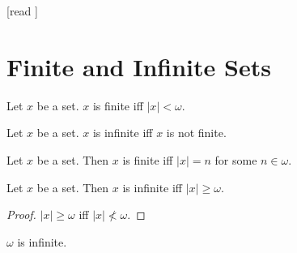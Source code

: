 \documentclass[10pt]{article}
\begin{document}
  \begin{imports}
    \begin{forthel}
      [read ]
    \end{forthel}
  \end{imports}


  \section*{Finite and Infinite Sets}

  \begin{forthel}
    \begin{definition}[id=SET_THEORY_07_5346658235711488,printid]
      Let $x$ be a set.
      $x$ is finite iff $|x| < \omega$.
    \end{definition}
  \end{forthel}

  \begin{forthel}
    \begin{definition}[id=SET_THEORY_07_8295412068777984,printid]
      Let $x$ be a set.
      $x$ is infinite iff $x$ is not finite.
    \end{definition}
  \end{forthel}

  \begin{forthel}
    \begin{proposition}[id=SET_THEORY_07_3806229474312192,printid]
      Let $x$ be a set.
      Then $x$ is finite iff $|x| = n$ for some $n \in \omega$.
    \end{proposition}
  \end{forthel}

  \begin{forthel}
    \begin{proposition}[id=SET_THEORY_07_3174577070931968,printid]
      Let $x$ be a set.
      Then $x$ is infinite iff $|x| \geq \omega$.
    \end{proposition}
    \begin{proof}
      $|x| \geq \omega$ iff $|x| \nless \omega$.
    \end{proof}
  \end{forthel}

  \begin{forthel}
    \begin{proposition}[id=SET_THEORY_07_9154385075632368,printid]
      $\omega$ is infinite.
    \end{proposition}
  \end{forthel}
\end{document}
